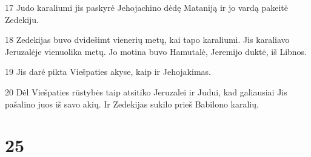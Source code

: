 \par 17 Judo karaliumi jis paskyrė Jehojachino dėdę Mataniją ir jo vardą pakeitė Zedekiju. 
\par 18 Zedekijas buvo dvidešimt vienerių metų, kai tapo karaliumi. Jis karaliavo Jeruzalėje vienuolika metų. Jo motina buvo Hamutalė, Jeremijo duktė, iš Libnos. 
\par 19 Jis darė pikta Viešpaties akyse, kaip ir Jehojakimas. 
\par 20 Dėl Viešpaties rūstybės taip atsitiko Jeruzalei ir Judui, kad galiausiai Jis pašalino juos iš savo akių. Ir Zedekijas sukilo prieš Babilono karalių.



\chapter{25}

